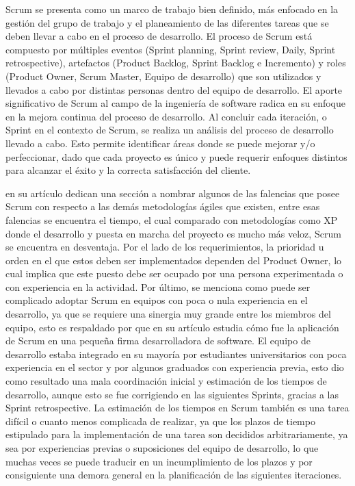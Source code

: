 \documentclass[a4paper,10pt]{article}
\begin{document}
	Scrum se presenta como un marco de trabajo bien definido, más enfocado en la gestión del grupo de trabajo y el planeamiento de las diferentes tareas que se deben llevar a cabo en el proceso de desarrollo. El proceso de Scrum está compuesto por múltiples eventos (Sprint planning, Sprint review, Daily, Sprint retrospective), artefactos (Product Backlog, Sprint Backlog e Incremento) y roles (Product Owner, Scrum Master, Equipo de desarrollo) que son utilizados y llevados a cabo por distintas personas dentro del equipo de desarrollo. El aporte significativo de Scrum al campo de la ingeniería de software radica en su enfoque en la mejora continua del proceso de desarrollo. Al concluir cada iteración, o Sprint en el contexto de Scrum, se realiza un análisis del proceso de desarrollo llevado a cabo. Esto permite identificar áreas donde se puede mejorar y/o perfeccionar, dado que cada proyecto es único y puede requerir enfoques distintos para alcanzar el éxito y la correcta satisfacción del cliente.
	
	\textcite{rodriguez2015que} en su artículo dedican una sección a nombrar algunos de las falencias que posee Scrum con respecto a las demás metodologías ágiles que existen, entre esas falencias se encuentra el tiempo, el cual comparado con metodologías como XP donde el desarrollo y puesta en marcha del proyecto es mucho más veloz, Scrum se encuentra en desventaja. Por el lado de los requerimientos, la prioridad u orden en el que estos deben ser implementados dependen del Product Owner, lo cual implica que este puesto debe ser ocupado por una persona experimentada o con experiencia en la actividad. Por último, se menciona como puede ser complicado adoptar Scrum en equipos con poca o nula experiencia en el desarrollo, ya que se requiere una sinergia muy grande entre los miembros del equipo, esto es respaldado por \textcite{barrios2012scrum} que en su artículo estudia cómo fue la aplicación de Scrum en una pequeña firma desarrolladora de software. El equipo de desarrollo estaba integrado en su mayoría por estudiantes universitarios con poca experiencia en el sector y por algunos graduados con experiencia previa, esto dio como resultado una mala coordinación inicial y estimación de los tiempos de desarrollo, aunque esto se fue corrigiendo en las siguientes Sprints, gracias a las Sprint retrospective. La estimación de los tiempos en Scrum también es una tarea difícil o cuanto menos complicada de realizar, ya que los plazos de tiempo estipulado para la implementación de una tarea son decididos arbitrariamente, ya sea por experiencias previas o suposiciones del equipo de desarrollo, lo que muchas veces se puede traducir en un incumplimiento de los plazos y por consiguiente una demora general en la planificación de las siguientes iteraciones.
	
\end{document}
